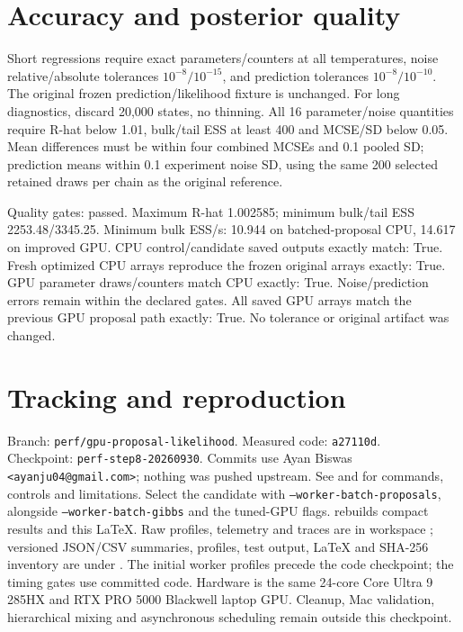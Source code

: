 \documentclass[11pt]{article}
\begin{document}
\section*{Accuracy and posterior quality}
Short regressions require exact parameters/counters at all temperatures, noise
relative/absolute tolerances $10^{-8}/10^{-15}$, and prediction tolerances
$10^{-8}/10^{-10}$. The original frozen prediction/likelihood fixture is unchanged.
For long diagnostics, discard 20,000 states, no thinning. All 16 parameter/noise
quantities require R-hat below 1.01, bulk/tail ESS at least 400 and MCSE/SD below
0.05. Mean differences must be within four combined MCSEs and 0.1 pooled SD;
prediction means within 0.1 experiment noise SD, using the same 200 selected
retained draws per chain as the original reference.

Quality gates: passed. Maximum R-hat 1.002585; minimum bulk/tail ESS 2253.48/3345.25.
Minimum bulk ESS/s: 10.944 on batched-proposal CPU, 14.617 on improved GPU.
CPU control/candidate saved outputs exactly match: True.
Fresh optimized CPU arrays reproduce the frozen original arrays exactly: True.
GPU parameter draws/counters match CPU exactly: True. Noise/prediction
errors remain within the declared gates. All saved GPU arrays match the previous
GPU proposal path exactly: True. No tolerance or original artifact was changed.
\section*{Tracking and reproduction}
\begingroup\small\raggedright
Branch: \texttt{perf/gpu-proposal-likelihood}. Measured code: \texttt{a27110d}.\\
Checkpoint: \texttt{perf-step8-20260930}. Commits use Ayan Biswas
\texttt{<ayanju04@gmail.com>}; nothing was pushed upstream.
See  and 
for commands, controls and limitations. Select the candidate with
\texttt{--worker-batch-proposals}, alongside \texttt{--worker-batch-gibbs} and the tuned-GPU flags.
 rebuilds compact results and this LaTeX.
Raw profiles, telemetry and traces are in workspace ;
versioned JSON/CSV summaries, profiles, test output, LaTeX and SHA-256 inventory
are under . The initial worker profiles
precede the code checkpoint; the timing gates use committed code. Hardware is
the same 24-core Core Ultra 9 285HX and RTX PRO 5000 Blackwell laptop GPU.
Cleanup, Mac validation, hierarchical mixing and asynchronous scheduling remain
outside this checkpoint.
\par\endgroup
\end{document}
